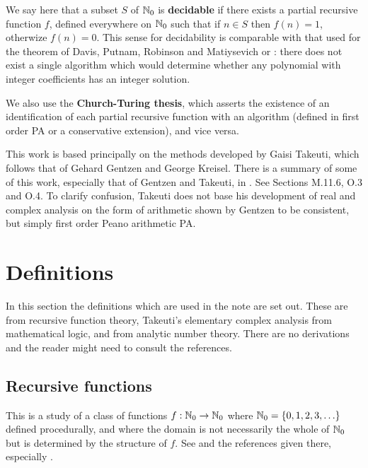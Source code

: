 \documentclass[12pt]{article}
\begin{document}
We say here that a subset $S$ of $\mathbb{N}_0$ is {\bf decidable} if there exists a partial recursive function $f$, defined everywhere on $\mathbb{N}_0$ such that if $n\in S$ then $f(n)=1$, otherwize $f(n)=0$. This sense for decidability is comparable with that used for the theorem of Davis, Putnam, Robinson and Matiysevich \cite{DPRM, Mati} or \cite[theorem 10.15]{bro}: there does not exist a single algorithm which would determine whether any polynomial with integer coefficients has an integer solution.\par

We also use the {\bf Church-Turing thesis}, which asserts the existence of an identification of each partial recursive function with an algorithm (defined in first order PA or a conservative extension), and vice versa.  

This work is based principally on the methods developed by Gaisi Takeuti, which follows that of Gehard Gentzen and George Kreisel. There is a summary of some of this work, especially that of Gentzen and Takeuti, in \cite{bro}. See Sections M.11.6, O.3 and O.4. To clarify confusion, Takeuti does not base his development of real and complex analysis on the form of arithmetic shown by Gentzen to be consistent, but simply first order Peano arithmetic PA.
\bigskip

\section{Definitions}
\label{defs}

In this section the definitions which are used in the note are set out. These are from recursive function theory, Takeuti's elementary complex analysis from mathematical logic, and from analytic number theory. There are no derivations and the reader might need to consult the references.\par

\subsection{Recursive functions}

This is a study of a class of functions $f:\mathbb{N}_0\rightarrow\mathbb{N}_0$ where $\mathbb{N}_0=\{0,1,2,3,\ldots\}$ defined procedurally, and where the domain is not necessarily the whole of $\mathbb{N}_0$ but is determined by the structure of $f$. See \cite[Sections N.2-N.4]{bro} and the references given there, especially \cite{cut}.\par
\end{document}
